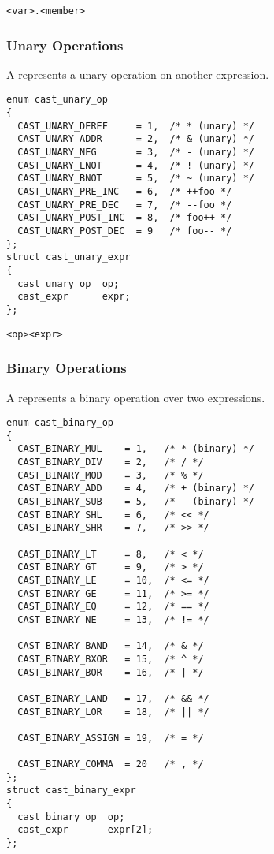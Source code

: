 \begin{verbatim}
<var>.<member>
\end{verbatim}

\subsubsection{Unary Operations}

A  represents a unary operation on another expression.

\begin{verbatim}
enum cast_unary_op
{
  CAST_UNARY_DEREF     = 1,  /* * (unary) */
  CAST_UNARY_ADDR      = 2,  /* & (unary) */
  CAST_UNARY_NEG       = 3,  /* - (unary) */
  CAST_UNARY_LNOT      = 4,  /* ! (unary) */
  CAST_UNARY_BNOT      = 5,  /* ~ (unary) */
  CAST_UNARY_PRE_INC   = 6,  /* ++foo */
  CAST_UNARY_PRE_DEC   = 7,  /* --foo */
  CAST_UNARY_POST_INC  = 8,  /* foo++ */
  CAST_UNARY_POST_DEC  = 9   /* foo-- */
};
struct cast_unary_expr
{
  cast_unary_op  op;
  cast_expr      expr;
};
\end{verbatim}

\begin{verbatim}
<op><expr>
\end{verbatim}

\subsubsection{Binary Operations}

A  represents a binary operation over two expressions.

\begin{verbatim}
enum cast_binary_op
{
  CAST_BINARY_MUL    = 1,   /* * (binary) */
  CAST_BINARY_DIV    = 2,   /* / */
  CAST_BINARY_MOD    = 3,   /* % */
  CAST_BINARY_ADD    = 4,   /* + (binary) */
  CAST_BINARY_SUB    = 5,   /* - (binary) */
  CAST_BINARY_SHL    = 6,   /* << */
  CAST_BINARY_SHR    = 7,   /* >> */

  CAST_BINARY_LT     = 8,   /* < */
  CAST_BINARY_GT     = 9,   /* > */
  CAST_BINARY_LE     = 10,  /* <= */
  CAST_BINARY_GE     = 11,  /* >= */
  CAST_BINARY_EQ     = 12,  /* == */
  CAST_BINARY_NE     = 13,  /* != */

  CAST_BINARY_BAND   = 14,  /* & */
  CAST_BINARY_BXOR   = 15,  /* ^ */
  CAST_BINARY_BOR    = 16,  /* | */

  CAST_BINARY_LAND   = 17,  /* && */
  CAST_BINARY_LOR    = 18,  /* || */

  CAST_BINARY_ASSIGN = 19,  /* = */

  CAST_BINARY_COMMA  = 20   /* , */
};
struct cast_binary_expr
{
  cast_binary_op  op;
  cast_expr       expr[2];
};
\end{verbatim}

